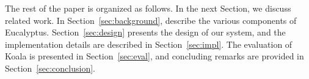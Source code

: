 The rest of the paper is organized as follows.  In the next Section, we discuss related work.  In Section~\ref{sec:background}, describe the various components of Eucalyptus.  Section~\ref{sec:design} presents the design of our system, and the implementation details are described in Section~\ref{sec:impl}.  The evaluation of Koala is presented in Section~\ref{sec:eval}, and concluding remarks are provided in Section~\ref{sec:conclusion}.%
